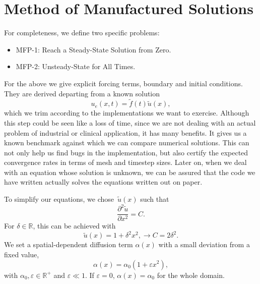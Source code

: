 \documentclass[../../main.tex]{subfiles}
\begin{document}
\section{Method of Manufactured Solutions}
\label{sec:1d_fom_toy_problem}

For completeness, we define two specific problems:
\begin{itemize}
    \item MFP-1: Reach a Steady-State Solution from Zero.
    \item MFP-2: Unsteady-State for All Times.
\end{itemize}
For the above we give explicit forcing terms, boundary and initial conditions.
They are derived departing from a known solution
\begin{equation}
    u_e(x,t) = \tilde{f}(t) \tilde{u}(x),
\end{equation}
which we trim according to the implementations we want to exercise.
Although this step could be seen like a loss of time, since we are not dealing with an actual problem of industrial or clinical application, it has many benefits.
It gives us a known benchmark against which we can compare numerical solutions.
This can not only help us find bugs in the implementation, but also certify the expected convergence rates in terms of mesh and timestep sizes.
Later on, when we deal with an equation whose solution is unknown, we can be assured that the code we have written actually solves the equations written out on paper. 

To simplify our equations, we chose~$\tilde{u}(x)$ such that
\begin{equation}
    \frac{\partial^2\tilde{u}}{\partial x^2} = C.
\end{equation}
For $\delta\in\mathbb{R}$, this can be achieved with 
\begin{equation}
    \tilde{u}(x) = 1 + \delta^2 x^2, \rightarrow C = 2 \delta^2.
\end{equation}
We set a spatial-dependent diffusion term $\alpha(x)$ with a small deviation from a fixed value,
\begin{equation}
    \label{eq:1d_fom_mfp_diffusion_term}
    \alpha(x) = \alpha_0(1 + \varepsilon x^2),
\end{equation}
with $\alpha_0, \varepsilon \in \mathbb{R}^{+}$ and $\varepsilon \ll 1$.
If $\varepsilon=0$, $\alpha(x) = \alpha_0$ for the whole domain.

\end{document}
